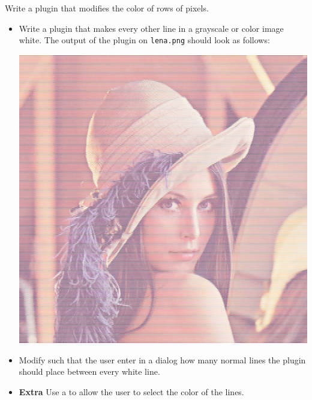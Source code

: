 \documentclass{book}
\begin{document}
\begin{exercise}
Write a plugin that modifies the color of rows of pixels.
\begin{itemize}
  \item Write a plugin  that makes every other line in a grayscale or color image white. The output of the plugin on \texttt{lena.png} should look as follows:

\begin{center}
\includegraphics[scale=0.2]{lena-white-lines.png}
\end{center}

\item Modify  such that the user enter in a dialog how many normal lines the plugin should place between every white line.

\item \textbf{Extra} Use a  to allow the user to select the color of the lines.
\end{itemize}
\end{exercise}
\end{document}
